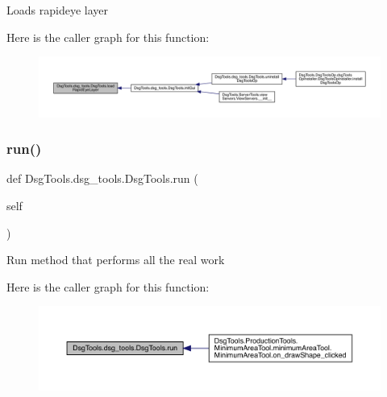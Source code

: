 \begin{DoxyVerb}Loads rapideye layer
\end{DoxyVerb}
 Here is the caller graph for this function\+:
\nopagebreak
\begin{figure}[H]
\begin{center}
\leavevmode
\includegraphics[width=350pt]{class_dsg_tools_1_1dsg__tools_1_1_dsg_tools_affa471f53e1d341e8996ac5c7e9e3544_icgraph}
\end{center}
\end{figure}
\mbox{\label{class_dsg_tools_1_1dsg__tools_1_1_dsg_tools_af701b6c2bc2031bcfd34083e45b8f6ac}} 
\subsubsection{\texorpdfstring{run()}{run()}}
{\footnotesize\ttfamily def Dsg\+Tools.\+dsg\+\_\+tools.\+Dsg\+Tools.\+run (\begin{DoxyParamCaption}\item[{}]{self }\end{DoxyParamCaption})}

\begin{DoxyVerb}Run method that performs all the real work
\end{DoxyVerb}
 Here is the caller graph for this function\+:
\nopagebreak
\begin{figure}[H]
\begin{center}
\leavevmode
\includegraphics[width=350pt]{class_dsg_tools_1_1dsg__tools_1_1_dsg_tools_af701b6c2bc2031bcfd34083e45b8f6ac_icgraph}
\end{center}
\end{figure}
\mbox{\label{class_dsg_tools_1_1dsg__tools_1_1_dsg_tools_a9040f837b61d2ecf1be25d3b2d0e1094}} 

